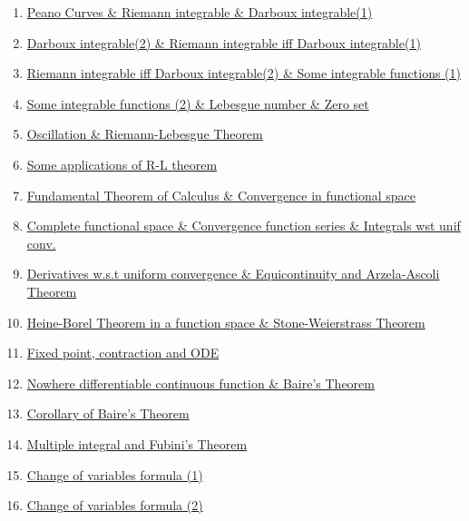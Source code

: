 \documentclass[11pt]{article}
\begin{document}
\begin{enumerate}
	\item 	\href{https://mp.weixin.qq.com/s/tmhCsB-kJ4BPKmPREeIaBw}{Peano Curves \& Riemann integrable \& Darboux integrable(1)}	%
	\item 	\href{https://mp.weixin.qq.com/s/147QppZMOXzIhNVcEtfTIg}{Darboux integrable(2) \& Riemann integrable iff Darboux integrable(1)}	%
	\item 	\href{https://mp.weixin.qq.com/s/M_-st-WoKh4soOjIXX5g0Q}{Riemann integrable iff Darboux integrable(2) \& Some integrable functions (1)}	%
	\item 	\href{https://mp.weixin.qq.com/s/Jt7X7XkeQ4SZmLt3Xz-cSQ}{Some integrable functions (2) \& Lebesgue number \& Zero set}	%
	\item	\href{https://mp.weixin.qq.com/s/px5q4TwGmqg4dugKperRUg}{Oscillation \& Riemann-Lebesgue Theorem}	%
	\item	\href{https://mp.weixin.qq.com/s/L09Z6ol8pDlXTU3nhWA9xg}{Some applications of R-L theorem}	%
	\item	\href{https://mp.weixin.qq.com/s/7FH61HZZ4lOGuwhQW4YKCw}{Fundamental Theorem of Calculus \& Convergence in functional space} 	%
	\item 	\href{https://mp.weixin.qq.com/s/-S4cIef_jiF4aM3LX7VcJQ}{Complete functional space \& Convergence function series \& Integrals wst unif conv.}	%
	\item 	\href{https://mp.weixin.qq.com/s/qyGJIhlP9Aqwf6GvGjSN8g}{Derivatives w.s.t uniform convergence \& Equicontinuity and Arzela-Ascoli Theorem}	%
	\item 	\href{https://mp.weixin.qq.com/s/iOiftePQi0OuShi7f8pDDA}{Heine-Borel Theorem in a function space \& Stone-Weierstrass Theorem}	%
	\item 	\href{https://mp.weixin.qq.com/s/wrnH0EfvWdpe147qNfj3Kw}{Fixed point, contraction and ODE}	%
	\item 	\href{https://mp.weixin.qq.com/s/Qn99qwTaHMuQuVMiYyf0CQ}{Nowhere differentiable continuous function \& Baire’s Theorem}	%
	\item 	\href{https://mp.weixin.qq.com/s/iwcOC0OTkTHJwLHr6brCrQ}{Corollary of Baire’s Theorem}	%
	\item 	\href{https://mp.weixin.qq.com/s/5Lrq2GqOxJuu2B268AuxlQ}{Multiple integral and Fubini’s Theorem}	%
	\item	\href{https://mp.weixin.qq.com/s/vG0ybcY3tLWhcAUNPtfFmw}{Change of variables formula (1)}	%
	\item	\href{https://mp.weixin.qq.com/s/aFb8lovr6X4caO3NNkWc4Q}{Change of variables formula (2)}	%

\end{enumerate}
\end{document}
